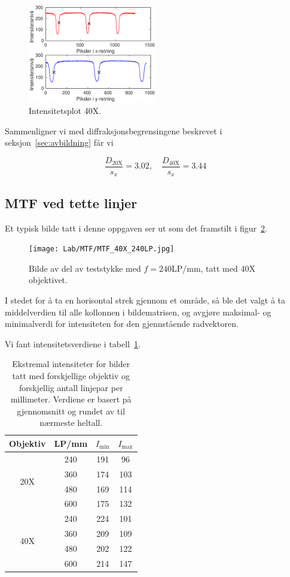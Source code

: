 \documentclass[a4paper,11pt, twocolumn]{article}
\begin{document}
\begin{figure}[!ht]
	\centering
	\includegraphics[width = 0.5\textwidth]{Lab/gitter40x.eps}
	\caption{Intensitetsplot 40X.}
	\label{fig:intensitet40x}
\end{figure}

Sammenligner vi med diffraksjonsbegrensingene beskrevet i seksjon~\ref{sec:avbildning} får vi

\begin{equation}
	\frac{D_{20\text{X}}}{s_x} = 3.02, \quad \frac{D_{40\text{X}}}{s_x} = 3.44
	\label{eq:diffpersx}
\end{equation} 

\subsection{MTF ved tette linjer}
Et typisk bilde tatt i denne oppgaven ser ut som det framstilt i figur~\ref{fig:mtfpic}.
\begin{figure}[!ht]
	\centering
	\texttt{[image: Lab/MTF/MTF\_40X\_240LP.jpg]}
	\caption{Bilde av del av teststykke med $f=240$LP/mm, tatt med 40X objektivet.}
	\label{fig:mtfpic}
\end{figure}

I stedet for å ta en horisontal strek gjennom et område, så ble det valgt å ta middelverdien til alle kollonnen i bildematrisen, og avgjøre maksimal- og minimalverdi for intensiteten for den gjennstående radvektoren.

Vi fant intensitetsverdiene i tabell~\ref{tab:mtfintensitet}. 
\begin{table}
	\centering
	\caption{Ekstremal intensiteter for bilder tatt med forskjellige objektiv og forskjellig antall linjepar per millimeter. Verdiene er basert på gjennomsnitt og rundet av til nærmeste heltall.}
	\label{tab:mtfintensitet}
	\begin{tabular}{cccc}
		\toprule
		\toprule
		Objektiv & LP/mm & $I_\text{min}$ & $I_\text{max}$\\
		\midrule
		\multirow{4}{*}{20X} & 240 &191 & 96 \\
		&360 &174 &103 \\
		&480 &169 &114 \\
		&600 &175 &132 \\
		\midrule
		\multirow{4}{*}{40X} & 240 &224 &101 \\
		&360 &209 &109 \\
		&480 &202 &122 \\
		&600 &214 &147 \\
		\toprule
	\end{tabular}
\end{table}
\end{document}
